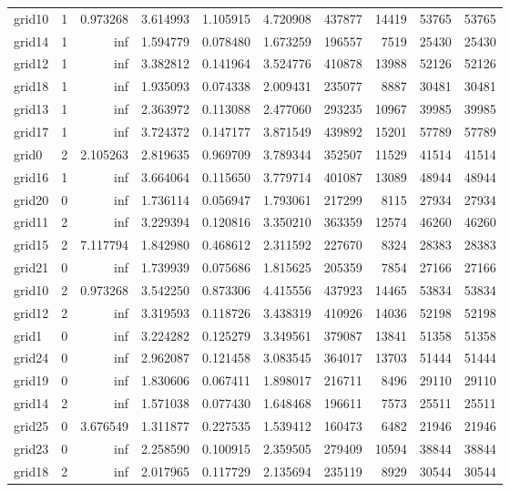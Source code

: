 \documentclass[../../../thesis.tex]{subfiles}
\begin{document}
\begin{longtable}{|l|r|r|r|r|r|r|r|r|r|}
grid10 & 1 & 0.973268 & 3.614993 & 1.105915 & 4.720908 & 437877 & 14419 & 53765 & 53765 \\
grid14 & 1 & inf & 1.594779 & 0.078480 & 1.673259 & 196557 & 7519 & 25430 & 25430 \\
grid12 & 1 & inf & 3.382812 & 0.141964 & 3.524776 & 410878 & 13988 & 52126 & 52126 \\
grid18 & 1 & inf & 1.935093 & 0.074338 & 2.009431 & 235077 & 8887 & 30481 & 30481 \\
grid13 & 1 & inf & 2.363972 & 0.113088 & 2.477060 & 293235 & 10967 & 39985 & 39985 \\
grid17 & 1 & inf & 3.724372 & 0.147177 & 3.871549 & 439892 & 15201 & 57789 & 57789 \\
grid0 & 2 & 2.105263 & 2.819635 & 0.969709 & 3.789344 & 352507 & 11529 & 41514 & 41514 \\
grid16 & 1 & inf & 3.664064 & 0.115650 & 3.779714 & 401087 & 13089 & 48944 & 48944 \\
grid20 & 0 & inf & 1.736114 & 0.056947 & 1.793061 & 217299 & 8115 & 27934 & 27934 \\
grid11 & 2 & inf & 3.229394 & 0.120816 & 3.350210 & 363359 & 12574 & 46260 & 46260 \\
grid15 & 2 & 7.117794 & 1.842980 & 0.468612 & 2.311592 & 227670 & 8324 & 28383 & 28383 \\
grid21 & 0 & inf & 1.739939 & 0.075686 & 1.815625 & 205359 & 7854 & 27166 & 27166 \\
grid10 & 2 & 0.973268 & 3.542250 & 0.873306 & 4.415556 & 437923 & 14465 & 53834 & 53834 \\
grid12 & 2 & inf & 3.319593 & 0.118726 & 3.438319 & 410926 & 14036 & 52198 & 52198 \\
grid1 & 0 & inf & 3.224282 & 0.125279 & 3.349561 & 379087 & 13841 & 51358 & 51358 \\
grid24 & 0 & inf & 2.962087 & 0.121458 & 3.083545 & 364017 & 13703 & 51444 & 51444 \\
grid19 & 0 & inf & 1.830606 & 0.067411 & 1.898017 & 216711 & 8496 & 29110 & 29110 \\
grid14 & 2 & inf & 1.571038 & 0.077430 & 1.648468 & 196611 & 7573 & 25511 & 25511 \\
grid25 & 0 & 3.676549 & 1.311877 & 0.227535 & 1.539412 & 160473 & 6482 & 21946 & 21946 \\
grid23 & 0 & inf & 2.258590 & 0.100915 & 2.359505 & 279409 & 10594 & 38844 & 38844 \\
grid18 & 2 & inf & 2.017965 & 0.117729 & 2.135694 & 235119 & 8929 & 30544 & 30544 \\

\end{longtable}
\end{document}
